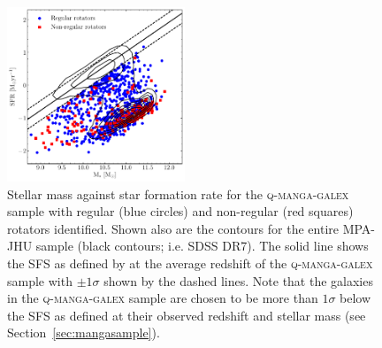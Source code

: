 \documentclass[useAMS,usenatbib]{mn2e}
\begin{document}
\begin{figure}
\centering
\includegraphics[width=0.475\textwidth]{../figures/nonSF_FR_SR_SFS_scatter.pdf}
\caption{Stellar mass against star formation rate for the \textsc{q-manga-galex} sample with regular (blue circles) and non-regular (red squares) rotators identified. Shown also are the contours for the entire MPA-JHU sample (black contours; i.e. SDSS DR7). The solid line shows the SFS as defined by \cite{peng10} at the average redshift of the \textsc{q-manga-galex} sample with $\pm 1 \sigma$ shown by the dashed lines. Note that the galaxies in the \textsc{q-manga-galex} sample are chosen to be more than $1\sigma$ below the SFS as defined at their observed redshift and stellar mass (see Section~\ref{sec:mangasample}).}
\label{fig:masvsfr}
\end{figure}
\end{document}

